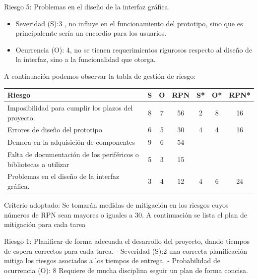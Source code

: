 \documentclass[
11pt, %
codirector, %
]{charter}
\begin{document}
Riesgo 5: Problemas en el diseño de la interfaz gráfica.
\begin{itemize}
	\item Severidad (S):3 , no influye en el funcionamiento del prototipo, sino que es principalemte sería un encordio para los usuarios.
	\item Ocurrencia (O): 4, no se tienen requerimientos rigurosos respecto al diseño de la interfaz, sino a la funcionalidad que otorga.
\end{itemize}


A continuación podemos observar la tabla de gestión de riesgo:

\begin{table}[htpb]
\centering
\begin{tabularx}{\linewidth}{@{}|X|c|c|c|c|c|c|@{}}
\hline
\rowcolor[HTML]{C0C0C0} 
Riesgo & S & O & RPN & S* & O* & RPN* \\ \hline
      Imposibilidad para cumplir los plazos del proyecto. & 8  &  7 &  56  &   2 &  8  & 16     \\ \hline
      Errores de diseño del prototipo & 6  & 5  &  30   &   4 & 4   &16      \\ \hline
      Demora en la adquisición de componentes &  9 & 6  & 54    &    &    &      \\ \hline
      Falta de documentación de los periféricos o bibliotecas a utilizar &  5 & 3  &  15   &    &    &      \\ \hline
      Problemas en el diseño de la interfaz gráfica. &  3 & 4  &   12  &  4  &  6  &  24    \\ \hline
\end{tabularx}%
\end{table}

Criterio adoptado: 
Se tomarán medidas de mitigación en los riesgos cuyos números de RPN sean mayores o iguales a 30.
A continuación se lista el plan de mitigación para cada tarea
 
Riesgo 1: Planificar de forma adecuada el desarrollo del proyecto, dando tiempos de espera correctos para cada tarea.
  - Severidad (S):2 una correcta planificación mitiga los riesgos asociados a los tiempos de entrega.
  - Probabilidad de ocurrencia (O): 8 Requiere de mucha disciplina seguir un plan de forma concisa.
\end{document}
